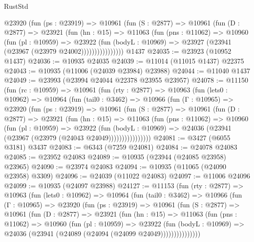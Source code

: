 \begin{lexlean}{RustStd}
\begin{coremodule}
{\begin{coremodule}
{{{{{{{{{{{{{{{{{{{{{{{{{{{{{{{{{{{{{{{{{{{{{{{{{{{{{{{{{{{{{{{{{{{{{{{{{{{{{{{{{{{{{              @23920
                (fun (ps : @23919) =>
                @10961
                  (fun (S : @2877) =>
                  @10961
                    (fun (D : @2877) =>
                    @23921
                      (fun (hn : @15) =>
                      @11063
                        (fun (pns : @11062) =>
                        @10960
                          (fun (pl : @10959) =>
                          @23922
                            (fun (bodyL : @10969) =>
                            @23927 (@23941 (@23967 (@23979 @24002))))))))))))))))
    @1437
@24035 := @23923 (@10952 @1437)
@24036 := @10935 @24035
@24039 := @11014 (@11015 @1437) @22375
@24043 := @10935 (@11006 (@24039 @23984) @23988)
@24044 := @11040 @1437
@24049 := @23993 (@23994 @24044 @22378 @23955 @23957)
@24078 := @11150
    (fun (rc : @10959) =>
    @10961
      (fun (rty : @2877) =>
      @10963
        (fun (lets0 : @10962) =>
        @10964
          (fun (tail0 : @3462) =>
          @10966
            (fun (Γ : @10965) =>
            @23920
              (fun (ps : @23919) =>
              @10961
                (fun (S : @2877) =>
                @10961
                  (fun (D : @2877) =>
                  @23921
                    (fun (hn : @15) =>
                    @11063
                      (fun (pns : @11062) =>
                      @10960
                        (fun (pl : @10959) =>
                        @23922
                          (fun (bodyL : @10969) =>
                          @24036 (@23941 (@23967 (@23979 (@24043 @24049))))))))))))))))
@24081 := @3427 (@6055 @3181) @3437
@24083 := @6343 (@7259 @24081)
@24084 := @24078 @24083
@24085 := @23952 @24083
@24089 := @10935 (@23944 (@24085 @23958) @23965)
@24090 := @23974 @24083
@24094 := @10935 (@11065 (@24090 @23958) @3309)
@24096 := @24039 (@11022 @24083)
@24097 := @11006 @24096
@24099 := @10935 (@24097 @23988)
@24127 := @11153
    (fun (rty : @2877) =>
    @10963
      (fun (lets0 : @10962) =>
      @10964
        (fun (tail0 : @3462) =>
        @10966
          (fun (Γ : @10965) =>
          @23920
            (fun (ps : @23919) =>
            @10961
              (fun (S : @2877) =>
              @10961
                (fun (D : @2877) =>
                @23921
                  (fun (hn : @15) =>
                  @11063
                    (fun (pns : @11062) =>
                    @10960
                      (fun (pl : @10959) =>
                      @23922
                        (fun (bodyL : @10969) =>
                        @24036 (@23941 (@24089 (@24094 (@24099 @24049)))))))))))))))
}}}}}}}}}}}}}}}}}}}}}}}}}}}}}}}}}}}}}}}}}}}}}}}}}}}}}}}}}}}}}}}}}}}}}}}}}}}}}}}}}}}}}
\end{coremodule}}
\end{coremodule}
\end{lexlean}
